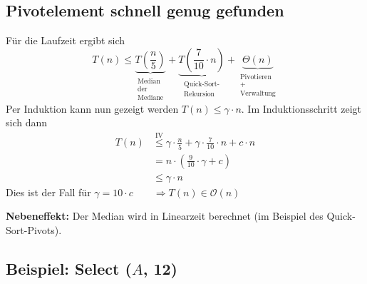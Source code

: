 \documentclass{scrartcl}%
\begin{document}
    \subsection*{Pivotelement schnell genug gefunden}
    Für die Laufzeit ergibt sich
    \begin{equation*}
        T(n) \leq \underbrace{T(\dfrac{n}{5})}_{\substack{\text{Median} \\ \text{der} \\ \text{Mediane}}}
        + \underbrace{T(\dfrac{7}{10} \cdot n)}_{\substack{\text{Quick-Sort-} \\ \text{Rekursion}}}
        + \underbrace{\Theta(n)}_{\substack{\text{Pivotieren} \\ \text{+} \\ \text{Verwaltung}}}
    \end{equation*}
    Per Induktion kann nun gezeigt werden $T(n)\leq \gamma \cdot n$.
    Im Induktionsschritt zeigt sich dann
    \begin{equation*}
        \begin{flalign}
            T(n) & \overset{\text{IV}}{\leq} \gamma \cdot \frac{n}{5} + \gamma \cdot \frac{7}{10} \cdot n + c \cdot n\\\nonumber
            &= n \cdot (\frac{9}{10} \cdot \gamma + c)\\\nonumber
            &\leq \gamma \cdot n
        \end{flalign}
    \end{equation*}
    Dies ist der Fall für $\gamma = 10 \cdot c\qquad \Longrightarrow T(n) \in \mathcal{O}(n)$

    \textbf{\textsf{Nebeneffekt:}} Der Median wird in Linearzeit berechnet (im Beispiel des Quick-Sort-Pivots).

    \subsection*{Beispiel: Select ($A$, 12)}
\end{document}
